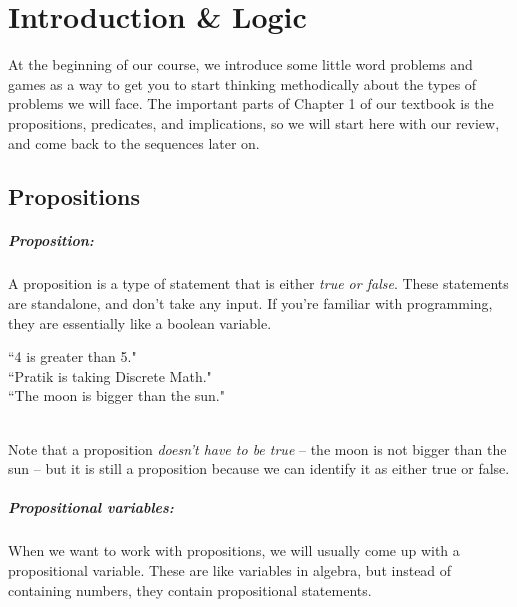 \documentclass[../RachelNotes.tex]{subfiles}
\begin{document}
    \chapter{Introduction \& Logic}

    At the beginning of our course, we introduce some little word
    problems and games as a way to get you to start thinking
    methodically about the types of problems we will face.
    The important parts of Chapter 1 of our textbook is the
    propositions, predicates, and implications, so we will start
    here with our review, and come back to the sequences later on.

    \section{Propositions}

        \begin{introNOHEAD}
            \paragraph{Proposition:}
                A proposition is a type of statement that is either
                \textit{true or false}. These statements are standalone,
                and don't take any input. If you're familiar with programming,
                they are essentially like a boolean variable.

                \begin{center}
                    ``4 is greater than 5." \\
                    ``Pratik is taking Discrete Math." \\
                    ``The moon is bigger than the sun." \\
                \end{center} ~\\
                
                Note that a proposition \textit{doesn't have to be true}
                -- the moon is not bigger than the sun -- but it is still
                a proposition because we can identify it as either true or false.

            \paragraph{Propositional variables:}
                When we want to work with propositions, we will usually
                come up with a propositional variable. These are like
                variables in algebra, but instead of containing numbers,
                they contain propositional statements.
        \end{introNOHEAD}
\end{document}
